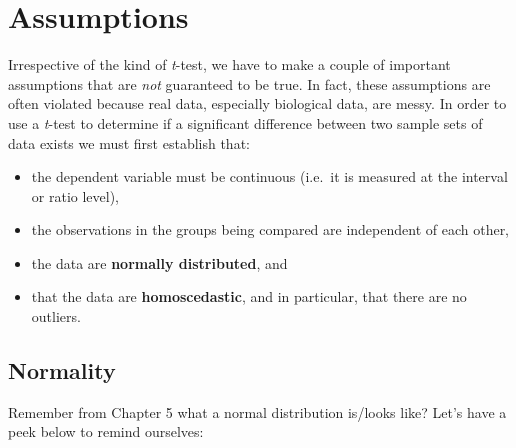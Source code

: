 \documentclass[english,10pt,a4paper,oneside]{book}
\providecommand{\tightlist}{%
  \setlength{\itemsep}{0pt}\setlength{\parskip}{0pt}}
\theoremstyle{definition}
\theoremstyle{definition}
\theoremstyle{definition}
\theoremstyle{remark}
\begin{document}
\hypertarget{assumptions}{%
\section{Assumptions}\label{assumptions}}

Irrespective of the kind of \emph{t}-test, we have to make a couple of
important assumptions that are \emph{not} guaranteed to be true. In
fact, these assumptions are often violated because real data, especially
biological data, are messy. In order to use a \emph{t}-test to determine
if a significant difference between two sample sets of data exists we
must first establish that:

\begin{itemize}
\tightlist
\item
  the dependent variable must be continuous (i.e.~it is measured at the
  interval or ratio level),
\item
  the observations in the groups being compared are independent of each
  other,
\item
  the data are \textbf{normally distributed}, and
\item
  that the data are \textbf{homoscedastic}, and in particular, that
  there are no outliers.
\end{itemize}

\hypertarget{normality}{%
\subsection{Normality}\label{normality}}

Remember from Chapter 5 what a normal distribution is/looks like? Let's
have a peek below to remind ourselves:
\end{document}
